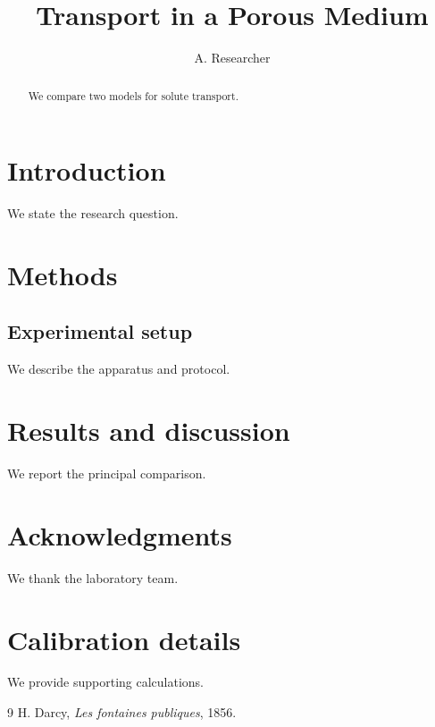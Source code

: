 \documentclass[10pt]{article}
\title{Transport in a Porous Medium}
\author{A. Researcher}
\begin{document}
\maketitle
\begin{abstract}
We compare two models for solute transport.
\end{abstract}
\tableofcontents

\section{Introduction}
We state the research question.
\section{Methods}
\subsection{Experimental setup}
We describe the apparatus and protocol.
\section{Results and discussion}
We report the principal comparison.
\section*{Acknowledgments}
We thank the laboratory team.
\appendix
\section{Calibration details}
We provide supporting calculations.
\begin{thebibliography}{9}
 H. Darcy, \emph{Les fontaines publiques}, 1856.
\end{thebibliography}
\end{document}
